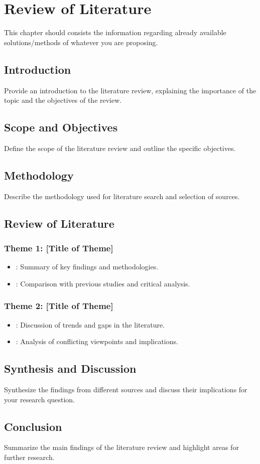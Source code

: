 
\chapter{Review of Literature }
This chapter should consists the information regarding already available solutions/methods of whatever you are proposing. 

	
	\section*{Introduction}
	Provide an introduction to the literature review, explaining the importance of the topic and the objectives of the review.
	
	\section*{Scope and Objectives}
	Define the scope of the literature review and outline the specific objectives.
	
	\section*{Methodology}
	Describe the methodology used for literature search and selection of sources.
	
	\section*{Review of Literature}
	
	\subsection*{Theme 1: [Title of Theme]}
	\begin{itemize}
		\item \citet{author1_year}: Summary of key findings and methodologies.
		\item \citet{author2_year}: Comparison with previous studies and critical analysis.
	\end{itemize}
	
	\subsection*{Theme 2: [Title of Theme]}
	\begin{itemize}
		\item \citet{author3_year}: Discussion of trends and gaps in the literature.
		\item \citet{author4_year}: Analysis of conflicting viewpoints and implications.
	\end{itemize}
	
	\section*{Synthesis and Discussion}
	Synthesize the findings from different sources and discuss their implications for your research question.
	
	\section*{Conclusion}
	Summarize the main findings of the literature review and highlight areas for further research.
	



